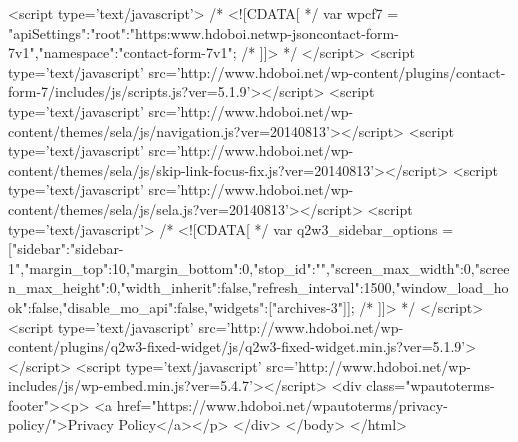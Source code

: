 <script type='text/javascript'>
/* <![CDATA[ */
var wpcf7 = {"apiSettings":{"root":"https:\/\/www.hdoboi.net\/wp-json\/contact-form-7\/v1","namespace":"contact-form-7\/v1"}};
/* ]]> */
</script>
<script type='text/javascript' src='http://www.hdoboi.net/wp-content/plugins/contact-form-7/includes/js/scripts.js?ver=5.1.9'></script>
<script type='text/javascript' src='http://www.hdoboi.net/wp-content/themes/sela/js/navigation.js?ver=20140813'></script>
<script type='text/javascript' src='http://www.hdoboi.net/wp-content/themes/sela/js/skip-link-focus-fix.js?ver=20140813'></script>
<script type='text/javascript' src='http://www.hdoboi.net/wp-content/themes/sela/js/sela.js?ver=20140813'></script>
<script type='text/javascript'>
/* <![CDATA[ */
var q2w3_sidebar_options = [{"sidebar":"sidebar-1","margin_top":10,"margin_bottom":0,"stop_id":"","screen_max_width":0,"screen_max_height":0,"width_inherit":false,"refresh_interval":1500,"window_load_hook":false,"disable_mo_api":false,"widgets":["archives-3"]}];
/* ]]> */
</script>
<script type='text/javascript' src='http://www.hdoboi.net/wp-content/plugins/q2w3-fixed-widget/js/q2w3-fixed-widget.min.js?ver=5.1.9'></script>
<script type='text/javascript' src='http://www.hdoboi.net/wp-includes/js/wp-embed.min.js?ver=5.4.7'></script>
<div class="wpautoterms-footer"><p>
		<a href="https://www.hdoboi.net/wpautoterms/privacy-policy/">Privacy Policy</a></p>
</div>
</body>
</html>
